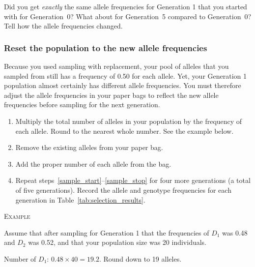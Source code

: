 \documentclass[12pt]{exam}
\newcommand{\allele}[1]{$#1$}
\begin{document}
\begin{questions}
	
	\question
	Did you get \emph{exactly} the same allele frequencies for
	Generation 1 that you started with for Generation~0? What about for 
	Generation~5 compared to Generation~0? Tell how the allele frequencies changed. 
	
	\vspace*{6\baselineskip}
	
\subsubsection*{Reset the population to the new allele frequencies}

Because you used sampling with replacement, your pool of alleles that 
you sampled from still has a frequency of 0.50 for each 
allele. Yet, your Generation 1 population almost certainly has 
different allele frequencies.  You must therefore adjust the
allele frequencies in your paper bags to reflect the new allele 
frequencies before sampling for the next generation.

\begin{enumerate} [resume]

	\item Multiply the total number of alleles in your population by the frequency of each allele. Round to the nearest whole number. See the example below.
	
	\item Remove the existing alleles from your paper bag.
	
	\item \label{sample_stop} Add the proper number of each allele from the bag.
	
	\item Repeat steps~\ref{sample_start}–\ref{sample_stop} for four more generations (a total of five generations). Record the allele and genotype frequencies for each generation in Table~\ref{tab:selection_results}. %
	
\end{enumerate} 

	\medskip
	
	\textsc{Example} 
	
	Assume that after sampling for Generation 1 that the frequencies of \allele{D_1} was 0.48 and \allele{D_2} was 0.52, and that your population size was 20 individuals.
	
	Number of \allele{D_1}: $0.48 \times 40 = 19.2.$ Round down to 19 alleles.
	

\end{questions}
\end{document}
